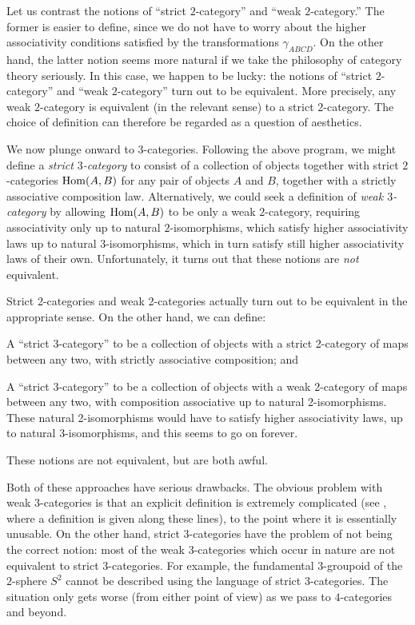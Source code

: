 Let us contrast the notions of ``strict $2$-category'' and ``weak
$2$-category.'' The former is easier to define, since we do not
have to worry about the higher associativity conditions satisfied
by the transformations $\gamma_{ABCD}$. On the other hand, the
latter notion seems more natural if we take the philosophy of
category theory seriously. In this case, we happen to be lucky:
the notions of ``strict $2$-category'' and ``weak $2$-category''
turn out to be equivalent. More precisely, any weak $2$-category
is equivalent (in the relevant sense) to a strict $2$-category. The
choice of definition can therefore be regarded as a question of
aesthetics.

We now plunge onward to $3$-categories. Following the above
program, we might define a {\it strict $3$-category} to consist of a
collection of objects together with strict $2$-categories
$\operatorname{Hom}(A,B)$ for any pair of objects $A$ and $B$, together with a
strictly associative composition law. Alternatively, we could seek
a definition of {\it weak $3$-category} by allowing $\operatorname{Hom}(A,B)$ to
be only a weak $2$-category, requiring associativity only up to
natural $2$-isomorphisms, which satisfy higher associativity laws
up to natural $3$-isomorphisms, which in turn satisfy still higher
associativity laws of their own. Unfortunately, it turns out that
these notions are {\em not} equivalent.
\begin{shaded}
Strict 2-categories and weak 2-categories actually turn out to be equivalent in the appropriate sense. On the other hand, we can define:
\begin{itemise}
\item A ``strict 3-category'' to be a collection of objects with a strict 2-category of maps between any two, with strictly associative composition; and
\item A ``strict 3-category'' to be a collection of objects with a weak 2-category of maps between any two, with composition associative up to natural 2-isomorphisms. These natural 2-isomorphisms would have to satisfy higher associativity laws, up to natural 3-isomorphisms, and this seems to go on forever.
\end{itemise}
These notions are not equivalent, but are both awful.
\end{shaded}


Both of these approaches have serious drawbacks. The obvious
problem with weak $3$-categories is that an explicit definition is
extremely complicated (see \cite{tricat}, where a definition is given along these lines), to the point where it is
essentially unusable. On the other hand, strict $3$-categories
have the problem of not being the correct notion: most of the weak
$3$-categories which occur in nature are not equivalent to
strict $3$-categories. For example, the fundamental $3$-groupoid of
the $2$-sphere $S^2$ cannot be described using the language of
strict $3$-categories. The situation only gets worse (from either
point of view) as we pass to $4$-categories and beyond.

